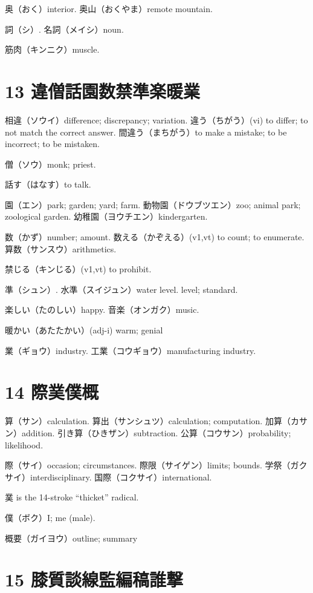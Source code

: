 奥（おく）interior.
奥山（おくやま）remote mountain.

詞（シ）.
名詞（メイシ）noun.

筋肉（キンニク）muscle.

\section{13 違僧話園数禁準楽暖業}

相違（ソウイ）difference; discrepancy; variation.
違う（ちがう）(vi) to differ; to not match the correct answer.
間違う（まちがう）to make a mistake; to be incorrect; to be mistaken.

僧（ソウ）monk; priest.

話す（はなす）to talk.

園（エン）park; garden; yard; farm.
動物園（ドウブツエン）zoo; animal park; zoological garden.
幼稚園（ヨウチエン）kindergarten.

数（かず）number; amount.
数える（かぞえる）(v1,vt) to count; to enumerate.
算数（サンスウ）arithmetics.

禁じる（キンじる）(v1,vt) to prohibit.

準（シュン）.
水準（スイジュン）water level. level; standard.

楽しい（たのしい）happy.
音楽（オンガク）music.

暖かい（あたたかい）(adj-i) warm; genial

業（ギョウ）industry.
工業（コウギョウ）manufacturing industry.

\section{14 際菐僕概}

算（サン）calculation.
算出（サンシュツ）calculation; computation.
加算（カサン）addition.
引き算（ひきザン）subtraction.
公算（コウサン）probability; likelihood.

際（サイ）occasion; circumstances.
際限（サイゲン）limits; bounds.
学祭（ガクサイ）interdisciplinary.
国際（コクサイ）international.

菐 is the 14-stroke ``thicket'' radical.

僕（ボク）I; me (male).

概要（ガイヨウ）outline; summary

\section{15 膝質談線監編稿誰撃}

